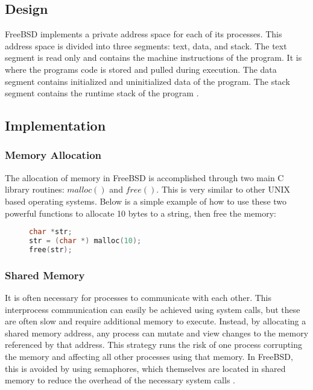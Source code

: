 \documentclass[letterpaper,draftclsnofoot,10pt,onecolumn,titlepage]{IEEEtran}\usepackage[margin=0.75in]{geometry}
\begin{document}
\subsection{Design}
FreeBSD implements a private address space for each of its processes. This address space is divided into three 
segments: text, data, and stack. The text segment is read only and contains the machine instructions of 
the program. It is where the programs code is stored and pulled during execution. The data segment 
contains initialized and uninitialized data of the program. The stack segment contains the runtime stack 
of the program \cite{freebsd}.

\subsection{Implementation}

\subsubsection{Memory Allocation}
The allocation of memory in FreeBSD is accomplished through two main C library routines: $malloc()$ and $free()$.
This is very similar to other UNIX based operating systems. Below is a simple example of how to use these 
two powerful functions to allocate 10 bytes to a string, then free the memory:

\begin{figure}[H]
\begin{lstlisting}[language=C++]
char *str;
str = (char *) malloc(10);
free(str);
\end{lstlisting}
\end{figure}

\subsubsection{Shared Memory}
It is often necessary for processes to communicate with each other. This interprocess communication can 
easily be achieved using system calls, but these are often slow and require additional memory to execute.
Instead, by allocating a shared memory address, any process can mutate and view changes to the memory 
referenced by that address. This strategy runs the risk of one process corrupting the memory and affecting
all other processes using that memory. In FreeBSD, this is avoided by using semaphores, which themselves 
are located in shared memory to reduce the overhead of the necessary system calls \cite{freebsd}.
\end{document}
